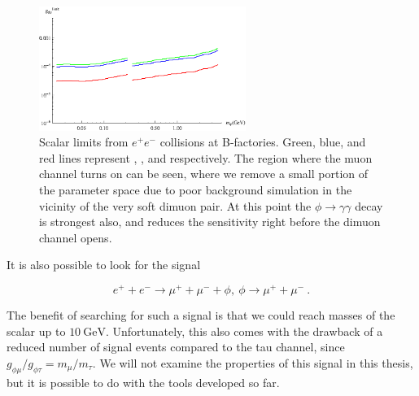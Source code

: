 \begin{figure}[h]
    \centering
    \includegraphics[width=0.6\textwidth]{Figures/limits/ee_all}
    \caption[Scalar sensitivity limits from $e^+ e^-$ collisions at B-factories.]{Scalar limits from $e^+ e^-$ collisions at B-factories. Green, blue, and red lines represent \babar, \belle, and \belletwo respectively. The region where the muon channel turns on can be seen, where we remove a small portion of the parameter space due to poor background simulation in the vicinity of the very soft dimuon pair. At this point the $\phi \rightarrow \gamma \gamma$ decay is strongest also, and reduces the sensitivity right before the dimuon channel opens.}
    \label{fig:ee_limits}
\end{figure}

It is also possible to look for the signal

\begin{equation}
    e^+ + e^- \rightarrow \mu^+ + \mu^- + \phi,~\phi \rightarrow \mu^+ + \mu^-~\textrm{.}
\end{equation}

\noindent The benefit of searching for such a signal is that we could reach masses of the scalar up to $10~\textrm{GeV}$.
Unfortunately, this also comes with the drawback of a reduced number of signal events compared to the tau channel, since $g_{\phi\mu} / g_{\phi\tau} = m_\mu / m_\tau$.
We will not examine the properties of this signal in this thesis, but it is possible to do with the tools developed so far.
